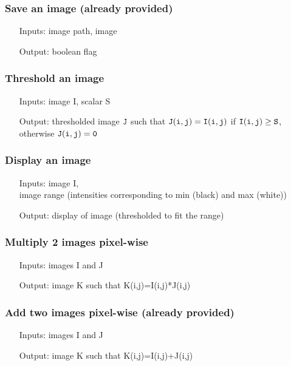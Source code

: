 \documentclass[10pt,a4paper]{article}
\begin{document}
\subsubsection{Save an image (already provided)} 
\begin{itemize}   
\item[Inputs:] image path, image
\item[Output:] boolean flag 
\end{itemize}    

\subsubsection{Threshold an image}
\begin{itemize}   
\item[Inputs:] image I, scalar S
\item[Output:]thresholded image $\tt J$ such that $\tt J(i,j)=I(i,j)$ if ${\tt I(i,j)\geq S}$, otherwise ${\tt J(i,j)=0}$
\end{itemize}        


\subsubsection{Display an image}
\begin{itemize}   
\item[Inputs:] image I, \\
  image range (intensities corresponding to min (black) and max (white))
\item[Output:] display of image (thresholded to fit the range)
\end{itemize}        

\subsubsection{Multiply 2 images pixel-wise}
\begin{itemize}   
\item[Inputs:] images I and J
\item[Output:] image K such that K(i,j)=I(i,j)*J(i,j)
\end{itemize}        

\subsubsection{Add two images pixel-wise (already provided)}
\begin{itemize}   
\item[Inputs:] images I and J
\item[Output:] image K such that K(i,j)=I(i,j)+J(i,j)
\end{itemize}        
\end{document}
